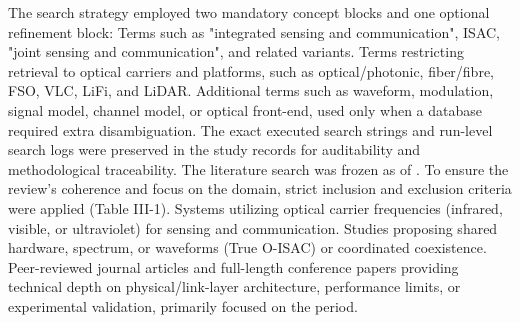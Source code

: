 {}The search strategy employed two mandatory concept blocks and one optional refinement block:\markdownRendererInterblockSeparator
{}\markdownRendererOlBeginTight
{} Terms such as "integrated sensing and communication", ISAC, "joint sensing and communication", and related variants.\markdownRendererOlItemEnd 
{} Terms restricting retrieval to optical carriers and platforms, such as optical/photonic, fiber/fibre, FSO, VLC, LiFi, and LiDAR.\markdownRendererOlItemEnd 
{} Additional terms such as waveform, modulation, signal model, channel model, or optical front-end, used only when a database required extra disambiguation.\markdownRendererOlItemEnd 
\markdownRendererOlEndTight \markdownRendererInterblockSeparator
{}The exact executed search strings and run-level search logs were preserved in the study records for auditability and methodological traceability. The literature search was frozen as of .\markdownRendererInterblockSeparator
{}
\markdownRendererSectionEnd \markdownRendererSectionBegin
{}\markdownRendererInterblockSeparator
{}To ensure the review's coherence and focus on the  domain, strict inclusion and exclusion criteria were applied (Table III-1).\markdownRendererParagraphSeparator
{}\markdownRendererInterblockSeparator
{}\markdownRendererUlBeginTight
\markdownRendererUlItem {} Systems utilizing optical carrier frequencies (infrared, visible, or ultraviolet) for  sensing and communication.\markdownRendererUlItemEnd 
\markdownRendererUlItem {} Studies proposing shared hardware, spectrum, or waveforms (True O-ISAC) or coordinated coexistence.\markdownRendererUlItemEnd 
\markdownRendererUlItem {} Peer-reviewed journal articles and full-length conference papers providing technical depth on physical/link-layer architecture, performance limits, or experimental validation, primarily focused on the  period.\markdownRendererUlItemEnd 
\markdownRendererUlEndTight \markdownRendererInterblockSeparator
